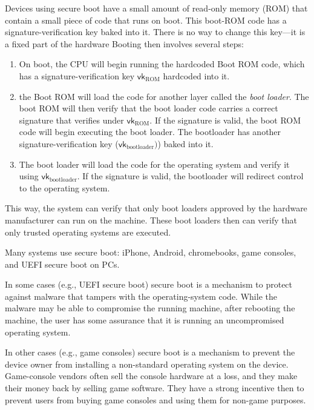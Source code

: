 \documentclass[
  letterpaper,
]{scrbook}
\providecommand{\tightlist}{%
  \setlength{\itemsep}{0pt}\setlength{\parskip}{0pt}}
\newcommand{\vk}{\mathsf{vk}}
\theoremstyle{definition}
\theoremstyle{plain}
\theoremstyle{plain}
\theoremstyle{remark}
\begin{document}
Devices using secure boot have a small amount of read-only memory (ROM)
that contain a small piece of code that runs on boot. This boot-ROM code
has a signature-verification key baked into it. There is no way to
change this key---it is a fixed part of the hardware Booting then
involves several steps:

\begin{enumerate}
\def\labelenumi{\arabic{enumi}.}
\tightlist
\item
  On boot, the CPU will begin running the hardcoded Boot ROM code, which
  has a signature-verification key \(\vk_\text{ROM}\) hardcoded into it.
\item
  the Boot ROM will load the code for another layer called the
  \emph{boot loader}. The boot ROM will then verify that the boot loader
  code carries a correct signature that verifies under
  \(\vk_\text{ROM}\). If the signature is valid, the boot ROM code will
  begin executing the boot loader. The bootloader has another
  signature-verification key (\(\vk_\text{bootloader})\)) baked into it.
\item
  The boot loader will load the code for the operating system and verify
  it using \(\vk_\text{bootloader}\). If the signature is valid, the
  bootloader will redirect control to the operating system.
\end{enumerate}

This way, the system can verify that only boot loaders approved by the
hardware manufacturer can run on the machine. These boot loaders then
can verify that only trusted operating systems are executed.

Many systems use secure boot: iPhone, Android, chromebooks, game
consoles, and UEFI secure boot on PCs.

In some cases (e.g., UEFI secure boot) secure boot is a mechanism to
protect against malware that tampers with the operating-system code.
While the malware may be able to compromise the running machine, after
rebooting the machine, the user has some assurance that it is running an
uncompromised operating system.

In other cases (e.g., game consoles) secure boot is a mechanism to
prevent the device owner from installing a non-standard operating system
on the device. Game-console vendors often sell the console hardware at a
loss, and they make their money back by selling game software. They have
a strong incentive then to prevent users from buying game consoles and
using them for non-game purposes.
\end{document}
